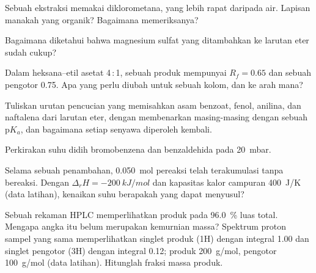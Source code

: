\begin{exercise}[$\star$]\label{exo:b2:lab-techniques-2:2}
Sebuah ekstraksi memakai diklorometana, yang lebih rapat daripada air. Lapisan manakah yang organik? Bagaimana memeriksanya?
\end{exercise}

\begin{exercise}[$\star$]\label{exo:b2:lab-techniques-2:3}
Bagaimana diketahui bahwa magnesium sulfat yang ditambahkan ke larutan eter sudah cukup?
\end{exercise}

\begin{exercise}[$\star$]\label{exo:b2:lab-techniques-2:4}
Dalam heksana--etil asetat 4\,:\,1, sebuah produk mempunyai $R_f = 0.65$ dan
sebuah pengotor 0.75. Apa yang perlu diubah untuk sebuah kolom, dan ke arah
mana?
\end{exercise}

\begin{exercise}[$\star\star$]\label{exo:b2:lab-techniques-2:5}
Tuliskan urutan pencucian yang memisahkan asam benzoat, fenol, anilina, dan
naftalena dari larutan eter, dengan membenarkan masing-masing dengan sebuah
$\mathrm pK_a$, dan bagaimana setiap senyawa diperoleh kembali.
\end{exercise}

\begin{exercise}[$\star\star$]\label{exo:b2:lab-techniques-2:6}
Perkirakan suhu didih bromobenzena dan benzaldehida pada \qty{20}{mbar}.
\end{exercise}

\begin{exercise}[$\star\star$]\label{exo:b2:lab-techniques-2:7}
Selama sebuah penambahan, \qty{0.050}{mol} pereaksi telah terakumulasi
tanpa bereaksi. Dengan $\Delta_rH =
\qty{-200}{kJ/mol}$ dan kapasitas kalor campuran \qty{400}{J/K} (data
latihan), kenaikan suhu berapakah yang dapat menyusul?
\end{exercise}

\begin{exercise}[$\star\star$]\label{exo:b2:lab-techniques-2:8}
Sebuah rekaman HPLC memperlihatkan produk pada 96.0~\% luas total. Mengapa
angka itu belum merupakan kemurnian massa? Spektrum proton sampel yang sama
memperlihatkan singlet produk (1H) dengan integral 1.00 dan singlet pengotor
(3H) dengan integral 0.12; produk \qty{200}{g/mol}, pengotor
\qty{100}{g/mol} (data latihan). Hitunglah fraksi massa produk.
\end{exercise}

